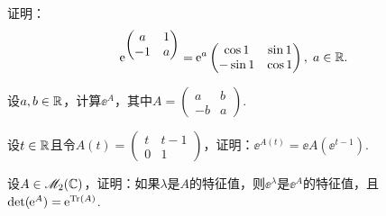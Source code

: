 \begin{problem}
  证明：
  \[
    \operatorname{\!\!\;\mathrm e}^{\begin{pmatrix}
      a & 1 \\
      -1 & a
    \end{pmatrix}} = \operatorname{\!\!\;\mathrm e}^a \begin{pmatrix}
      \cos 1 & \sin 1 \\
      -\sin 1 & \cos 1
    \end{pmatrix},\; a\in\mathbb R.
  \]
\end{problem}

\begin{problem}
  设$a,b\in\mathbb R$，计算$\ee^A$，其中$A=\begin{pmatrix}
    a & b \\
    -b & a
  \end{pmatrix}$.
\end{problem}

\begin{problem}
  \cite[p.205]{6} 设$t\in\mathbb R$且令$A(t)=\begin{pmatrix}
    t & t - 1 \\
    0 & 1
  \end{pmatrix}$，证明：$\ee^{A(t)}=\ee A(\ee^{t-1})$.
\end{problem}

\begin{problem}
  设$A\in\mathscr M_2(\mathbb C)$，证明：如果$\lambda$是$A$的特征值，则$\ee^\lambda$是$\ee^A$的特征值，且$\det(\operatorname{\!\!\;\mathrm e}^A)=\operatorname{\!\!\;\mathrm e}^{\operatorname{Tr}(A)}$.
\end{problem}


